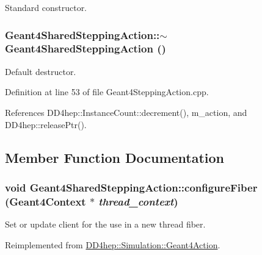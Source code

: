 Standard constructor. \hypertarget{class_d_d4hep_1_1_simulation_1_1_geant4_shared_stepping_action_a3a2b73cd49e3441d740456240d5125ab}{
\subsubsection[{$\sim$Geant4SharedSteppingAction}]{\setlength{\rightskip}{0pt plus 5cm}Geant4SharedSteppingAction::$\sim$Geant4SharedSteppingAction ()}}
\label{class_d_d4hep_1_1_simulation_1_1_geant4_shared_stepping_action_a3a2b73cd49e3441d740456240d5125ab}


Default destructor. 

Definition at line 53 of file Geant4SteppingAction.cpp.

References DD4hep::InstanceCount::decrement(), m\_\-action, and DD4hep::releasePtr().

\subsection{Member Function Documentation}
\hypertarget{class_d_d4hep_1_1_simulation_1_1_geant4_shared_stepping_action_ae023874861eb3048eba53ef6cd253224}{
\subsubsection[{configureFiber}]{\setlength{\rightskip}{0pt plus 5cm}void Geant4SharedSteppingAction::configureFiber ({\bf Geant4Context} $\ast$ {\em thread\_\-context})}}
\label{class_d_d4hep_1_1_simulation_1_1_geant4_shared_stepping_action_ae023874861eb3048eba53ef6cd253224}


Set or update client for the use in a new thread fiber. 

Reimplemented from \hyperlink{class_d_d4hep_1_1_simulation_1_1_geant4_action_a6adc7138508303e4e417cb48a737ab19}{DD4hep::Simulation::Geant4Action}.

